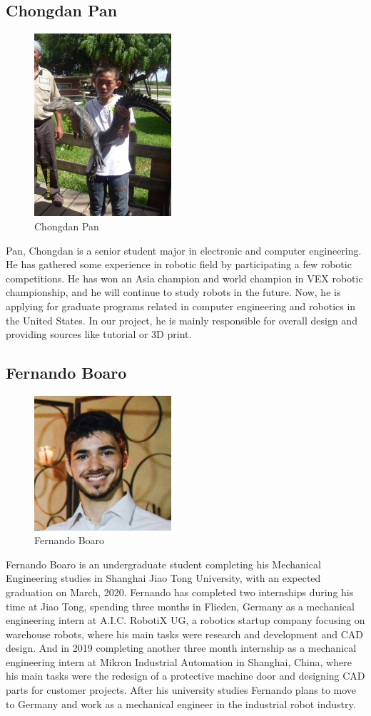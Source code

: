 \documentclass[12pt]{article}
\begin{document}
\subsection*{Chongdan Pan}
\begin{figure}[H]
    \centering
    \includegraphics[width=2in]{p.jpg}
    \caption{Chongdan Pan}
    \label{fig::pan}
\end{figure}
Pan, Chongdan is a senior student major in electronic and computer engineering. He has gathered some experience in robotic field by participating a few robotic competitions. He has won an Asia champion and world champion in VEX robotic championship, and he will continue to study robots in the future. Now, he is applying for graduate programs related in computer engineering and robotics in the United States. In our project, he is mainly responsible for overall design and providing sources like tutorial or 3D print.
\subsection*{Fernando Boaro}
\begin{figure}[H]
    \centering
    \includegraphics[width=2in]{f.png}
    \caption{Fernando Boaro}
    \label{fig::fer}
\end{figure}
Fernando Boaro is an undergraduate student completing his Mechanical Engineering studies in Shanghai Jiao Tong University, with an expected graduation on March, 2020. Fernando has completed two internships during his time at Jiao Tong, spending three months in Flieden, Germany as a mechanical engineering intern at A.I.C. RobotiX UG, a robotics startup company focusing on warehouse robots, where his main tasks were research and development and CAD design. And in 2019 completing another three month internship as a mechanical engineering intern at Mikron Industrial Automation in Shanghai, China, where his main tasks were the redesign of a protective machine door and designing CAD parts for customer projects. After his university studies Fernando plans to move to Germany and work as a mechanical engineer in the industrial robot industry.
\end{document}
